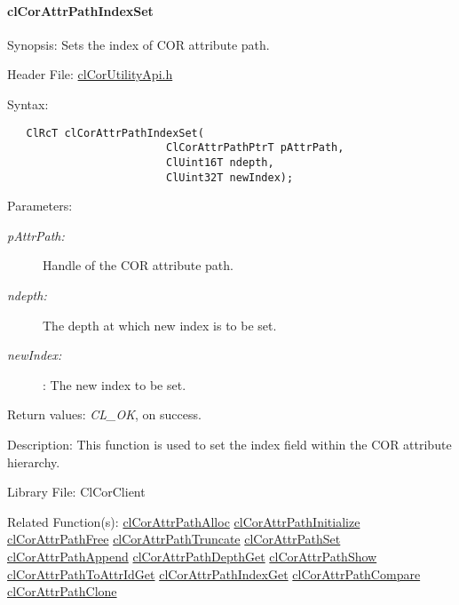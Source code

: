 \hypertarget{pagecor265}{}\paragraph{cl\-Cor\-Attr\-Path\-Index\-Set}\label{pagecor265}
\begin{Desc}
\item[Synopsis:]Sets the index of COR attribute path.\end{Desc}
\begin{Desc}
\item[Header File:]\hyperlink{cl_cor_utility_api_8h}{cl\-Cor\-Utility\-Api.h}\end{Desc}
\begin{Desc}
\item[Syntax:]

\footnotesize\begin{verbatim}   ClRcT clCorAttrPathIndexSet(
                         ClCorAttrPathPtrT pAttrPath,
                         ClUint16T ndepth,
                         ClUint32T newIndex);
\end{verbatim}
\normalsize
\end{Desc}
\begin{Desc}
\item[Parameters:]
\begin{description}
\item[{\em p\-Attr\-Path:}]Handle of the COR attribute path. \item[{\em ndepth:}]The depth at which new index is to be set. \item[{\em new\-Index:}]: The new index to be set.\end{description}
\end{Desc}
\begin{Desc}
\item[Return values:]{\em CL\_\-OK\/}, on success.\end{Desc}
\begin{Desc}
\item[Description:]This function is used to set the index field within the COR attribute hierarchy.\end{Desc}
\begin{Desc}
\item[Library File:]Cl\-Cor\-Client\end{Desc}
\begin{Desc}
\item[Related Function(s):]\hyperlink{group__group13}{cl\-Cor\-Attr\-Path\-Alloc} \hyperlink{group__group13}{cl\-Cor\-Attr\-Path\-Initialize} \hyperlink{group__group13}{cl\-Cor\-Attr\-Path\-Free} \hyperlink{group__group13}{cl\-Cor\-Attr\-Path\-Truncate} \hyperlink{group__group13}{cl\-Cor\-Attr\-Path\-Set} \hyperlink{group__group13}{cl\-Cor\-Attr\-Path\-Append} \hyperlink{group__group13}{cl\-Cor\-Attr\-Path\-Depth\-Get} \hyperlink{group__group13}{cl\-Cor\-Attr\-Path\-Show} \hyperlink{group__group13}{cl\-Cor\-Attr\-Path\-To\-Attr\-Id\-Get} \hyperlink{group__group13}{cl\-Cor\-Attr\-Path\-Index\-Get} \hyperlink{group__group13}{cl\-Cor\-Attr\-Path\-Compare} \hyperlink{group__group13}{cl\-Cor\-Attr\-Path\-Clone} \end{Desc}
